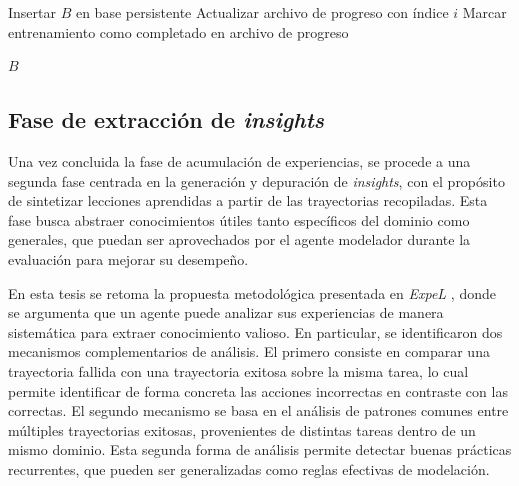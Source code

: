 \begin{algorithm}[H]
{{        
    }
    Insertar \(B\) en base persistente\;
    Actualizar archivo de progreso con índice \(i\)\;
}
Marcar entrenamiento como completado en archivo de progreso\;

\Return \(B\)\;
\end{algorithm}

\subsection{Fase de extracción de \textit{insights}}

Una vez concluida la fase de acumulación de experiencias, se procede a una segunda fase centrada en la generación y depuración de \textit{insights}, con el propósito de sintetizar lecciones aprendidas a partir de las trayectorias recopiladas. Esta fase busca abstraer conocimientos útiles tanto específicos del dominio como generales, que puedan ser aprovechados por el agente modelador durante la evaluación para mejorar su desempeño.

En esta tesis se retoma la propuesta metodológica presentada en \textit{ExpeL} \parencite{zhao2024expel}, donde se argumenta que un agente puede analizar sus experiencias de manera sistemática para extraer conocimiento valioso. En particular, se identificaron dos mecanismos complementarios de análisis. El primero consiste en comparar una trayectoria fallida con una trayectoria exitosa sobre la misma tarea, lo cual permite identificar de forma concreta las acciones incorrectas en contraste con las correctas. El segundo mecanismo se basa en el análisis de patrones comunes entre múltiples trayectorias exitosas, provenientes de distintas tareas dentro de un mismo dominio. Esta segunda forma de análisis permite detectar buenas prácticas recurrentes, que pueden ser generalizadas como reglas efectivas de modelación.

